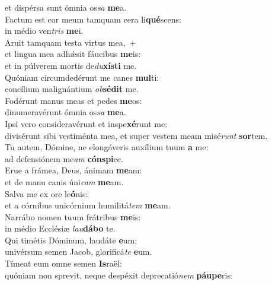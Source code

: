 \evenverse et dispérsa sunt ómnia os\textit{sa} \textbf{me}a.\\
\oddverse Factum est cor meum tamquam cera li\textbf{qué}scens:~\*\\
\oddverse in médio ven\textit{tris} \textbf{me}i.\\
\evenverse Aruit tamquam testa virtus mea,~+\\
\evenverse  et lingua mea adhǽsit fáucibus \textbf{me}is:~\*\\
\evenverse et in púlverem mortis de\textit{du}\textbf{xí}\textbf{sti} me.\\
\oddverse Quóniam circumdedérunt me canes \textbf{mul}ti:~\*\\
\oddverse concílium malignántium \textit{ob}\textbf{sé}\textbf{dit} me.\\
\evenverse Fodérunt manus meas et pedes \textbf{me}os:~\*\\
\evenverse dinumeravérunt ómnia os\textit{sa} \textbf{me}a.\\
\oddverse Ipsi vero consideravérunt et inspe\textbf{xé}runt me:~\*\\
\oddverse divisérunt sibi vestiménta mea, et super vestem meam misé\textit{runt} \textbf{sor}tem.\\
\evenverse Tu autem, Dómine, ne elongáveris auxílium tuum \textbf{a} me:~\*\\
\evenverse ad defensiónem me\textit{am} \textbf{cón}\textbf{spi}ce.\\
\oddverse Erue a frámea, Deus, ánimam \textbf{me}am:~\*\\
\oddverse et de manu canis úni\textit{cam} \textbf{me}am.\\
\evenverse Salva me ex ore le\textbf{ó}nis:~\*\\
\evenverse et a córnibus unicórnium humilitá\textit{tem} \textbf{me}am.\\
\oddverse Narrábo nomen tuum frátribus \textbf{me}is:~\*\\
\oddverse in médio Ecclésiæ \textit{lau}\textbf{dá}\textbf{bo} te.\\
\evenverse Qui timétis Dóminum, laudáte \textbf{e}um:~\*\\
\evenverse univérsum semen Jacob, glorificá\textit{te} \textbf{e}um.\\
\oddverse Tímeat eum omne semen \textbf{Is}raël:~\*\\
\oddverse quóniam non sprevit, neque despéxit deprecatió\textit{nem} \textbf{páu}\textbf{pe}ris:\\

